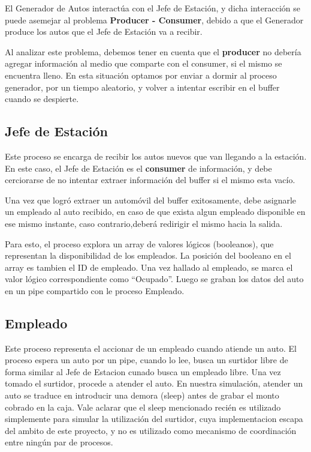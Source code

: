 \documentclass[12pt,a4paper,spanish]{article}
\begin{document}
		El Generador de Autos interactúa con el Jefe de Estación, y dicha interacción se puede
		asemejar al problema \textbf{Producer - Consumer}, debido a que el Generador produce
		los autos que el Jefe de Estación va a recibir. 

		Al analizar este problema, debemos tener en cuenta que el \textbf{producer} no debería
		agregar información al medio que comparte con el consumer, si el mismo se encuentra lleno.
		En esta situación optamos por enviar a dormir al proceso generador, por un tiempo
		aleatorio, y volver a intentar escribir en el buffer cuando se despierte.

	\subsection{Jefe de Estación}
		Este proceso se encarga de recibir los autos nuevos que van llegando a la estación. 
		En este caso, el Jefe de Estación es el \textbf{consumer} de información, y debe
		cerciorarse de no intentar extraer información del buffer si el mismo esta vacío.

		Una vez que logró extraer un automóvil del buffer exitosamente, debe asignarle 
		un empleado al auto recibido, en caso de que exista algun empleado disponible 
		en ese mismo instante, caso contrario,deberá redirigir el mismo hacia la salida.
		
		Para esto, el proceso explora un array de valores lógicos (booleanos), que representan la disponibilidad de los empleados. La posición del booleano en el array es tambien el ID de empleado. Una vez hallado al empleado, se marca el valor lógico correspondiente como ``Ocupado''. Luego se graban los datos del auto en un pipe compartido con le proceso Empleado.

	\subsection{Empleado}
	
	Este proceso representa el accionar de un empleado cuando atiende un auto. El proceso espera un auto por un pipe, cuando lo lee, busca un surtidor libre de forma similar al Jefe de Estacion cunado busca un empleado libre. Una vez tomado el surtidor, procede a atender el auto. En nuestra simulación, atender un auto se traduce en introducir una demora (sleep) antes de grabar el monto cobrado en la caja. Vale aclarar que el sleep mencionado recién es utilizado simplemente para simular la utilización del surtidor, cuya implementacion escapa del ambito de este proyecto, y no es utilizado como mecanismo de coordinación entre ningún par de procesos.
	
\end{document}
